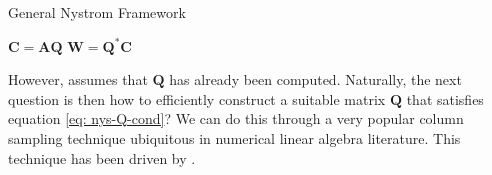 {\centering
\begin{minipage}{.85\linewidth}
    \begin{algorithm}[H]
        \caption{General Nystrom Framework}
        \label{alg: nys-gen}
        \SetAlgoLined
        \DontPrintSemicolon

        \BlankLine
        $\bm{C} = \bm{A} \bm{Q}$\;
        $\bm{W} = \bm{Q}^{\ast} \bm{C}$\;
        \BlankLine
    \end{algorithm}
\end{minipage}
\par}

However,  assumes that $\bm{Q}$ has already been computed. Naturally, the next question is then how to efficiently construct a suitable matrix $\bm{Q}$ that satisfies equation \ref{eq: nys-Q-cond}? We can do this through a very popular column sampling technique ubiquitous in numerical linear algebra literature. This technique has been driven by .


